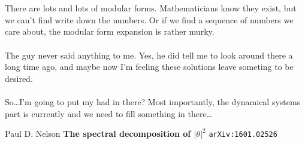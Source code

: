 \documentclass[12pt]{article}
\begin{document}
 \\ \\
There are lots and lots of modular forms.  Mathematicians know they exist, but we can't find write down the numbers.  Or if we find a sequence of numbers we care about, the modular form expansion is rather murky. \\ \\
The guy never said anything to me.  Yes, he did tell me to look around there a long time ago, and maybe now I'm feeling these solutions leave someting to be desired.  \\ \\So\dots I'm going to put my had in there? Most importantly, the dynamical systems part is currently  and we need to fill something in there\dots

\newpage  

\begin{thebibliography}{}

\item Paul D. Nelson \textbf{The spectral decomposition of $|\theta|^2$ } \;\texttt{arXiv:1601.02526}

\end{thebibliography}
\end{document}
